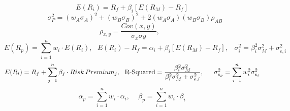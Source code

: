 $$E(R_{i}) = R_{f} + \beta_{i} \left[ E(R_{M}) - R_{f} \right]$$
$$ \,\,\,\,\, \sigma^{2}_{P} = (w_{A}\sigma_{A})^{2} + (w_{B}\sigma_{B})^{2} + 2(w_{A}\sigma_{A})(w_{B}\sigma_{B})\rho_{AB}$$
$$\rho_{x,y} = \frac{Cov(x,y)}{\sigma_{x}\sigma{y}}, \,\,\,\,$$
$$ E(R_{p}) = \sum_{i=1}^{n}w_{i}\cdot E(R_{i}), \,\,\,\,  E(R_{i}) - R_{f} =\alpha_{i} + \beta_{i}[E(R_{M})-R_{f}], \,\,\,\,\, \sigma^{2}_{i} = \beta^{2}_{i}\sigma^{2}_{M}+ \sigma^{2}_{e,i}$$
$$E(R_{i}) = R_{f} + \sum_{j=1}^{n}\beta_{j} \cdot Risk \, Premium_{j}, \,\,\,\, \textmd{R-Squared} = \frac{\beta^{2}_{i}\sigma^{2}_{M}}{\beta^{2}_{i}\sigma^{2}_{M}+ \sigma^{2}_{e,i}}, \,\,\,\,\,\,\,\,\, \sigma^{2}_{e_{p}} = \sum_{i=1}^{n}w^{2}_{i}\sigma^{2}_{e_{i}}$$
$$\alpha_{p} = \sum_{i=1}^{n} w_{i}\cdot \alpha_{i}, \,\,\,\,\,\,\, \beta_{p} = \sum_{i=1}^{n}w_{i}\cdot \beta_{i}$$